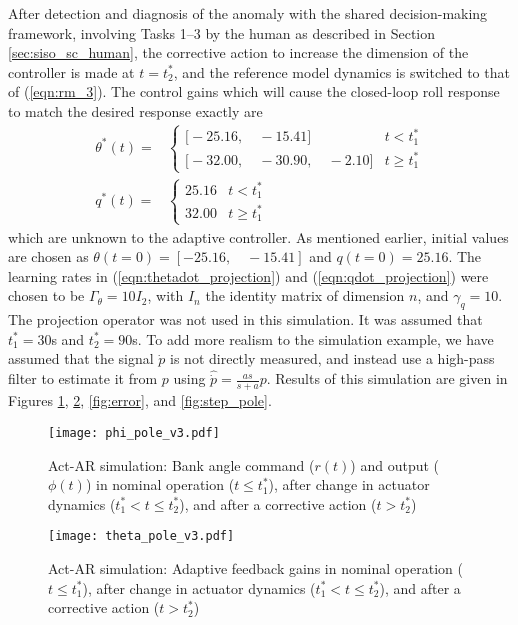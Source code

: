 After detection and diagnosis of the anomaly with the shared decision-making framework, involving Tasks 1--3 by the human as described in Section \ref{sec:siso_sc_human}, the corrective action to increase the dimension of the controller is made at $t = t_2^*$, and the reference model dynamics is switched to that of (\ref{eqn:rm_3}). The control gains which will cause the closed-loop roll response to match the desired response exactly are
\begin{align}
	\theta^*(t) = & \begin{cases}
		\Big[ -25.16, \quad -15.41 \Big] & t < t_1^* \\
		\Big[-32.00, \quad -30.90, \quad -2.10 \Big] & t \geq t_1^*
	\end{cases} \\
	q^*(t) = & \begin{cases}
		25.16 & t < t_1^* \\
		32.00 & t \geq t_1^*
	\end{cases}
\end{align}
\noindent which are unknown to the adaptive controller. As mentioned earlier, initial values are chosen as $\theta(t=0)= [-25.16, \quad -15.41]$ and $q(t=0)=25.16$. The learning rates in (\ref{eqn:thetadot_projection}) and (\ref{eqn:qdot_projection}) were chosen to be $\Gamma_\theta = 10 I_2$, with $I_n$ the identity matrix of dimension $n$, and $\gamma_q = 10$. The projection operator was not used in this simulation. It was assumed that $t_1^*=30$s and $t_2^*=90$s. To add more realism to the simulation example, we have assumed that the signal $\dot{p}$ is not directly measured, and instead use a high-pass filter to estimate it from $p$ using $\hat{\dot{p}} = \frac{as}{s+a} p$. Results of this simulation are given in Figures \ref{fig:command_and_output}, \ref{fig:theta}, \ref{fig:error}, and \ref{fig:step_pole}. 

\begin{figure}[h!]
	\centering
	\texttt{[image: phi\_pole\_v3.pdf]}
	\caption{Act-AR simulation: Bank angle command ($r(t)$) and output ($\phi(t)$) in nominal operation ($t \leq t_1^*$), after change in actuator dynamics ($t_1^* < t \leq t_2^*$), and after a corrective action ($t > t_2^*$)}
	\label{fig:command_and_output}
\end{figure}

\begin{figure}[h!]
	\centering
	\texttt{[image: theta\_pole\_v3.pdf]}
	\caption{Act-AR simulation: Adaptive feedback gains in nominal operation ($t \leq t_1^*$), after change in actuator dynamics ($t_1^* < t \leq t_2^*$), and after a corrective action ($t > t_2^*$)}
	\label{fig:theta}
\end{figure}

